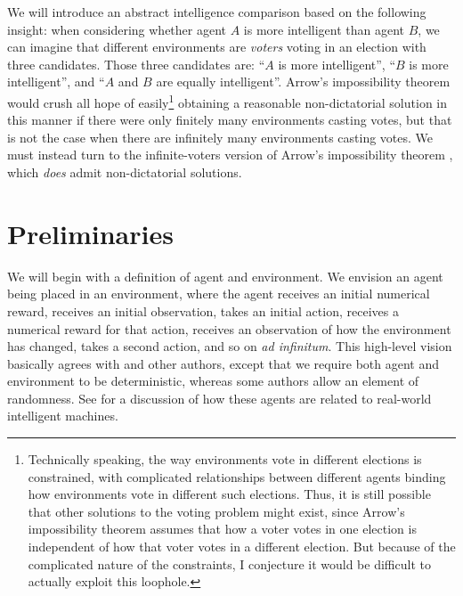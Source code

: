 \documentclass[twoside,11pt]{article}
\begin{document}
We will introduce an abstract intelligence comparison
based on the following insight:
when considering whether agent $A$ is more intelligent than agent $B$,
we can imagine that different environments are \emph{voters} voting in an election with
three candidates. Those three candidates are: ``$A$ is more intelligent'',
``$B$ is more intelligent'', and ``$A$ and $B$ are equally intelligent''.
Arrow's impossibility theorem \citep{arrow} would crush all hope of
easily\footnote{Technically speaking, the way environments vote in different elections
is constrained, with complicated relationships between different agents binding how
environments vote in different such elections. Thus, it is still possible that
other solutions to the voting problem might exist, since Arrow's impossibility theorem
assumes that
how a voter votes in one election is independent of how that voter votes
in a different election. But
because of the complicated nature of the constraints, I conjecture it
would be difficult to actually exploit this loophole.}
obtaining a
reasonable non-dictatorial solution in this manner if there were only finitely many
environments
casting votes, but that is not the case when there are infinitely many environments
casting votes.
We must instead turn to the infinite-voters version of
Arrow's impossibility theorem \citep{kirman} \citep[see also][]{fishburn},
which \emph{does} admit non-dictatorial solutions.


\section{Preliminaries}

We will begin with a definition of agent and environment.
We envision an agent being placed in an environment, where the agent
receives an initial numerical reward, receives an initial observation, takes an initial
action, receives a numerical reward for that action, receives an observation of how the
environment has changed, takes a second action, and so on \emph{ad infinitum}.
This high-level vision basically agrees with \citet{hutter2007}
and other authors,
except that we require both agent and environment to
be deterministic, whereas some authors allow an element of randomness.
See \citet{hutter2007} for a discussion of how these agents are related
to real-world intelligent machines.
\end{document}

